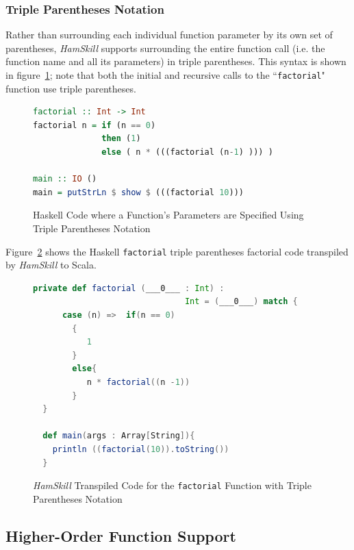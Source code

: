 \documentclass{report}
\begin{document}
\subsubsection{Triple Parentheses Notation}

Rather than surrounding each individual function parameter by its own set of parentheses, \textit{HamSkill} supports surrounding the entire function call (i.e. the function name and all its parameters) in triple parentheses.  This syntax is shown in figure~\ref{fig:haskellFunctionFactorial}; note that both the initial and recursive calls to the ``\texttt{factorial}" function use triple parentheses.

\begin{figure}[H]
\begin{mdframed}
\begin{lstlisting}[language=Haskell]
factorial :: Int -> Int
factorial n = if (n == 0)
              then (1)
              else ( n * (((factorial (n-1) ))) )

main :: IO ()
main = putStrLn $ show $ (((factorial 10)))
\end{lstlisting}
\end{mdframed}
\caption{Haskell Code where a Function's Parameters are Specified Using Triple Parentheses Notation}\label{fig:haskellFunctionFactorial}
\end{figure}

Figure~\ref{fig:scalaFunctionFactorial} shows the Haskell \texttt{factorial} triple parentheses factorial code transpiled by \textit{HamSkill} to Scala.

\begin{figure}[H]
\begin{mdframed}
\begin{lstlisting}[language=Scala]
  private def factorial (___0___ : Int) :
                               Int = (___0___) match {
      case (n) =>  if(n == 0)
        {
           1
        }
        else{
           n * factorial((n -1))
        }
  } 
  
  def main(args : Array[String]){
    println ((factorial(10)).toString())
  } 
\end{lstlisting}
\end{mdframed}
\caption{\textit{HamSkill} Transpiled Code for the \texttt{factorial}  Function with Triple Parentheses Notation}\label{fig:scalaFunctionFactorial}
\end{figure}


\subsection{Higher-Order Function Support}\label{sec:higherOrderFunctions}
\end{document}

